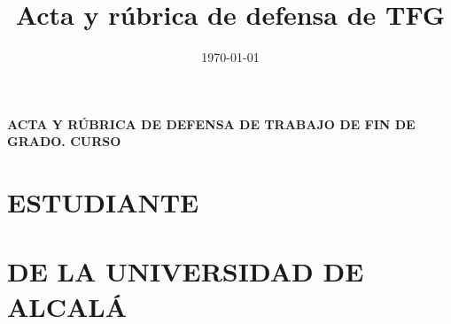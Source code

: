 \documentclass[11pt,a4paper,oneside]{article}
\title{Acta y rúbrica de defensa de TFG}  %
\date{\today}                                  %
\author{\myAcademicTutorFullName}                           %
\begin{document}
%
%



\noindent \textbf{ACTA Y RÚBRICA DE DEFENSA DE TRABAJO DE FIN DE GRADO. CURSO \myThesisAcademicYear}

\thispagestyle{plain}
\fancyhf{} %
\fancyfoot[C]{\thepage} %


\section*{ESTUDIANTE}

\begin{description}
  \item[Título del TFG:] \myBookTitleSpanish
  {                                               %
  \item[Título en inglés:] \myBookTitleEnglish    %
  }                                               %
  {                                               %
  }                                               %
  \item[Autor:] \myAuthorFullName
  \item[DNI:] \myAuthorDNI
  \item[Titulación:] \myDegreefull
\end{description}



\section*{\MakeUppercase{\wordTutorOrTutora} \MakeUppercase{\wordAcademicoOrAcademica} DE LA UNIVERSIDAD DE ALCALÁ}
\end{document}
